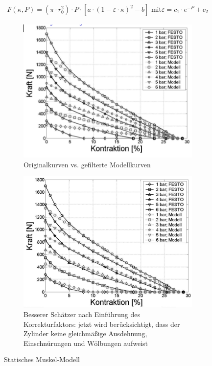 \begin{align*}
	F(\kappa, P) = (\pi \cdot r_0^2) \cdot P \cdot \left[a \cdot (1 - \varepsilon \cdot \kappa)^2 - b\right] \text{ mit} \varepsilon = c_1 \cdot e^{-P} + c_2
\end{align*}
\begin{figure}[h!]
	\centering
	\begin{subfigure}{.4\textwidth}
		\includegraphics[width=\linewidth]{figures/ch03_stat-mod0.png}
		\caption{Originalkurven vs. gefilterte Modellkurven}
	\end{subfigure}
	\begin{subfigure}{.4\textwidth}
		\includegraphics[width=\linewidth]{figures/ch03_stat-modell1.png}
		\caption{Besserer Schätzer nach Einführung des Korrekturfaktors: jetzt wird berücksichtigt, dass der Zylinder keine gleichmäßige Ausdehnung, Einschnürungen und Wölbungen aufweist}
	\end{subfigure}
	\caption{Statisches Muskel-Modell}
	\label{mck}
\end{figure}\\
